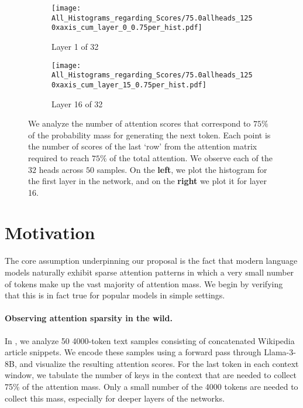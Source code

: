 \begin{figure}[t!]
    \begin{subfigure}[b]{0.48\columnwidth}
        \caption*{\hspace{6mm} Layer 1 of 32}
        \texttt{[image: All\_Histograms\_regarding\_Scores/75.0allheads\_1250xaxis\_cum\_layer\_0\_0.75per\_hist.pdf]}
    \end{subfigure}
    \hfill
    \begin{subfigure}[b]{0.48\columnwidth}
        \caption*{\hspace{6mm} Layer 16 of 32}
        \texttt{[image: All\_Histograms\_regarding\_Scores/75.0allheads\_1250xaxis\_cum\_layer\_15\_0.75per\_hist.pdf]}
    \end{subfigure}
    \caption{
    We analyze the number of attention scores that correspond to $75\%$ of the probability mass for generating the next token. Each point is the number of scores of the last `row' from the attention matrix required to reach $75\%$ of the total attention. We observe each of the $32$ heads across $50$ samples. 
    On the \textbf{left}, we plot the histogram for the first layer in the network, and on the \textbf{right} we plot it for layer 16. 
    }
    \label{fig:75_mass_hist}
\end{figure}

\section{Motivation}

The core assumption underpinning our proposal is the fact that modern language models naturally exhibit sparse attention patterns in which a very small number of tokens make up the vast majority of attention mass. We begin by verifying that this is in fact true for popular models in simple settings.

\paragraph{Observing attention sparsity in the wild.}

In , we analyze 50 4000-token text samples consisting of concatenated Wikipedia article snippets. We encode these samples using a forward pass through Llama-3-8B, and visualize the resulting attention scores.
For the last token in each context window, we tabulate the number of keys in the context that are needed to collect 75\% of the attention mass. 
Only a small number of the 4000 tokens are needed to collect this mass, especially for deeper layers of the networks.

